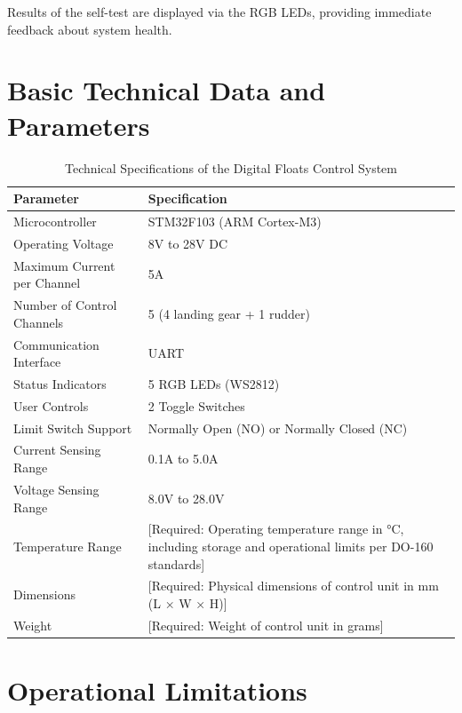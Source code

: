 \documentclass[12pt,a4paper,twoside,openright]{book}
\newcommand{\tabletextfont}{\normalfont\rmfamily}
\newcommand{\tableheadfont}{\normalfont\bfseries}
\begin{document}
Results of the self-test are displayed via the RGB LEDs, providing immediate feedback about system health.

\section{Basic Technical Data and Parameters}

\begin{table}[h]
\centering
\setlength{\tabcolsep}{5pt} %
\begin{tabular}{|p{}|p{}|}
\hline
\tableheadfont\textbf{Parameter} & \tableheadfont\textbf{Specification} \\
\hline
\tabletextfont Microcontroller & STM32F103 (ARM Cortex-M3) \\
\hline
\tabletextfont Operating Voltage & 8V to 28V DC \\
\hline
\tabletextfont Maximum Current per Channel & 5A \\
\hline
\tabletextfont Number of Control Channels & 5 (4 landing gear + 1 rudder) \\
\hline
\tabletextfont Communication Interface & UART \\
\hline
\tabletextfont Status Indicators & 5 RGB LEDs (WS2812) \\
\hline
\tabletextfont User Controls & 2 Toggle Switches \\
\hline
\tabletextfont Limit Switch Support & Normally Open (NO) or Normally Closed (NC) \\
\hline
\tabletextfont Current Sensing Range & 0.1A to 5.0A \\
\hline
\tabletextfont Voltage Sensing Range & 8.0V to 28.0V \\
\hline
\tabletextfont Temperature Range & {\color{missingred}[Required: Operating temperature range in °C, including storage and operational limits per DO-160 standards]} \\
\hline
\tabletextfont Dimensions & {\color{missingred}[Required: Physical dimensions of control unit in mm (L × W × H)]} \\
\hline
\tabletextfont Weight & {\color{missingred}[Required: Weight of control unit in grams]} \\
\hline
\end{tabular}
\caption{Technical Specifications of the Digital Floats Control System}
\end{table}

\section{Operational Limitations}
\end{document}

